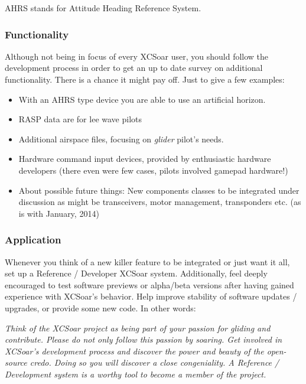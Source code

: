 AHRS stands for Attitude Heading Reference System.

\subsubsection*{Functionality} Although not being in focus of every XCSoar user, 
you should follow the development process in order to get an up to date survey on 
additional functionality. There is a chance it might pay off. Just to give a few 
examples:
\begin{itemize}
\item With an AHRS type device you are able to use an artificial horizon.
\item RASP data are for lee wave pilots
\item Additional airspace files, focusing on \emph{glider} pilot's needs.
\item Hardware command input devices, provided by enthusiastic hardware 
developers (there even were few cases, pilots involved gamepad hardware!)
\item About possible future things: New components classes to be integrated  
under discussion as might be transceivers, motor management, transponders etc. 
(as is with January, 2014)
\end{itemize}

\subsubsection*{Application} Whenever you think of a new killer feature to be 
integrated or just want it all, set up a Reference / Developer XCSoar system.
Additionally, feel deeply encouraged to test software previews or alpha/beta 
versions after having gained experience with XCSoar's behavior. Help improve 
stability of software updates / upgrades, or provide some new code. In other 
words:

\textsl{Think of the XCSoar project as being part of your passion for gliding and 
contribute. Please do not only follow this passion by soaring. Get involved in 
XCSoar's development process and discover the power and beauty of the open-source 
credo. 
Doing so you will discover a close congeniality. A Reference / Development system 
is a worthy tool to become a member of the project.}
